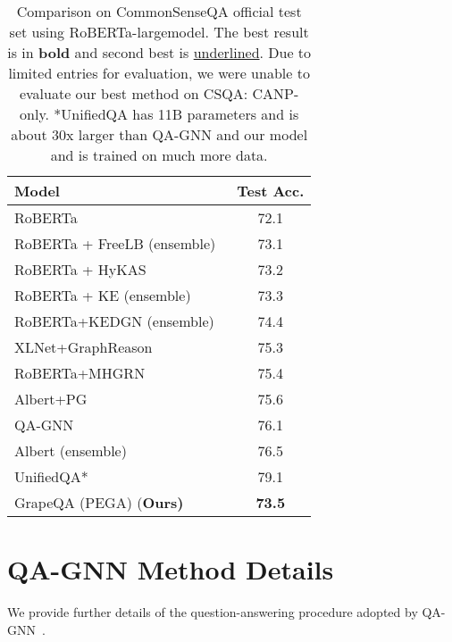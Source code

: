 \documentclass[11pt]{article}
\newcommand{\roberta}{RoBERTa-large}
\newcommand{\methodname}{GrapeQA}
\begin{document}
\begin{table}[t]
\small
\centering
\tabcolsep=0.02cm
\caption{Comparison on CommonSenseQA official test set using \roberta model. The best result is in \textbf{bold} and second best is \underline{underlined}.
Due to limited entries for evaluation, we were unable to evaluate our best method on CSQA: CANP-only.
*UnifiedQA has 11B parameters and is about 30x larger than QA-GNN and our model and is trained on much more data.}
\begin{tabular}{lc}

\toprule
\textbf{Model} & \textbf{Test Acc.}\\
\midrule
RoBERTa~\small{\cite{DBLP:journals/corr/abs-1907-11692}} & 72.1 \\
RoBERTa + FreeLB (ensemble)~\small{\cite{https://doi.org/10.48550/arxiv.1909.11764}}& 73.1 \\
RoBERTa + HyKAS~\small{\cite{https://doi.org/10.48550/arxiv.1910.14087}} & 73.2 \\
RoBERTa + KE (ensemble) & 73.3 \\
RoBERTa+KEDGN (ensemble) & 74.4 \\
XLNet+GraphReason~\small{\cite{https://doi.org/10.48550/arxiv.1909.05311}} & 75.3 \\
RoBERTa+MHGRN~\small{\cite{feng-etal-2020-scalable}} & 75.4 \\
Albert+PG~\small{\cite{wang-etal-2020-connecting}} & 75.6 \\ 
QA-GNN \small{\cite{mihaylov2018can}} & 76.1 \\
Albert (ensemble)~\small{\cite{conf/iclr/LanCGGSS20}} & 76.5 \\
UnifiedQA*~\small{\cite{https://doi.org/10.48550/arxiv.2005.00700}} & 79.1 \\
\midrule
\methodname{} (PEGA) (\bf \textbf{Ours}) & \bf 73.5 \\
\bottomrule
\end{tabular}

\label{tab:csqa_off}
\end{table}








\section{QA-GNN Method Details}
\label{app:qagnn}

We provide further details of the question-answering procedure adopted by QA-GNN~\cite{yasunaga-etal-2021-qa}.
\end{document}
